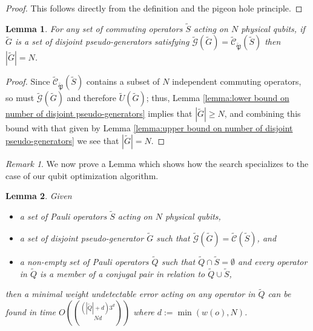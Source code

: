 \documentclass{amsbook}
\theoremstyle{plain}
\newtheorem{lemma}{Lemma}
\theoremstyle{definition}
\theoremstyle{remark}
\newtheorem{remark}{Remark}
\newcommand{\set}{\tilde}
\newcommand{\genfun}{\tilde{\mathcal{G}}}
\newcommand{\pauligroup}{{\set{\mathfrak{P}}}}
\newcommand{\centralizer}{\set{\mathcal{C}}}
\newcommand{\paren}[1]{\left(#1\right)}
\begin{document}
\begin{proof}
This follows directly from the definition and the pigeon hole principle.
\end{proof}

\begin{lemma}
\label{lemma:exact bound on number of disjoint pseudo-generators}
For any set of commuting operators $\set S$ acting on $N$ physical qubits, if $\set G$ is a set of disjoint pseudo-generators satisfying $\genfun(\set G)=\centralizer_\pauligroup(\set S)$ then $|\set G|= N$.
\end{lemma}

\begin{proof}
Since $\centralizer_\pauligroup(\set S)$ contains a subset of $N$ independent commuting operators, so must $\genfun(\set G)$ and therefore $\set U(\set G)$;  thus, Lemma \ref{lemma:lower bound on number of disjoint pseudo-generators} implies that $|\set G|\ge N$, and combining this bound with that given by Lemma \ref{lemma:upper bound on number of disjoint pseudo-generators} we see that $|\set G|=N$.
\end{proof}
\begin{remark}
We now prove a Lemma which shows how the search specializes to the case of our qubit optimization algorithm.
\end{remark}

\begin{lemma}
\label{lemma:search for minimal weight undetectable error}
Given
\begin{itemize}
\item a set of Pauli operators $\set S$ acting on $N$ physical qubits,
\item a set of disjoint pseudo-generator $\set G$ such that $\genfun(\set G)=\centralizer(\set S)$, and
\item a non-empty set of Pauli operators $\set Q$ such that $\set Q\cap\set S=\emptyset$ and every operator in $\set Q$ is a member of a conjugal pair in relation to $\set Q \cup \set S$,
\end{itemize}
then a minimal weight undetectable error acting on any operator in $\set Q$ can be found in time $O\paren{(|\set Q|+d)3^d\choose{N}{d}}$ where $d:=\min\paren{w(o),N}$.
\end{lemma}
\end{document}
